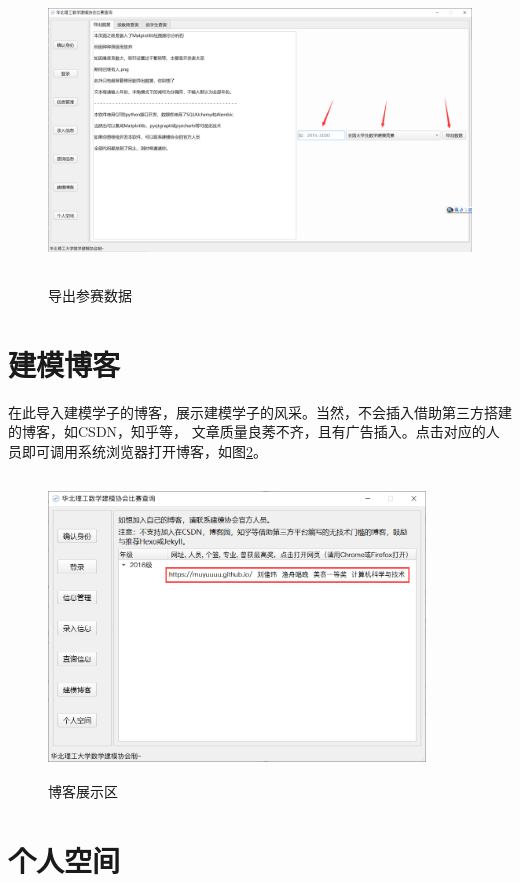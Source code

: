 \documentclass[cn, 11pt, chinese, show]{elegantbook}
\begin{document}
\begin{figure}[h]
    \centering
    \includegraphics[width=12cm, height=8cm]{figure/9.png}
    \caption{导出参赛数据}
    \label{fig:export_data}
\end{figure}

\newpage

\section{建模博客}

在此导入建模学子的博客，展示建模学子的风采。当然，不会插入借助第三方搭建的博客，如CSDN，知乎等，
文章质量良莠不齐，且有广告插入。点击对应的人员即可调用系统浏览器打开博客，如图\ref{fig:blog}。

\begin{figure}[h]
    \centering
    \includegraphics[width=10cm, height=8cm]{figure/10.png}
    \caption{博客展示区}
    \label{fig:blog}
\end{figure}

\section{个人空间}
\end{document}

